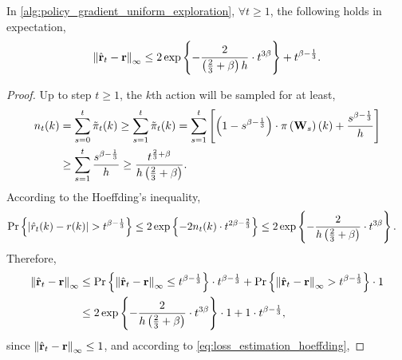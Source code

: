 \begin{thm}
\label{thm:reward_estimation_hoeffding}
    In \cref{alg:policy_gradient_uniform_exploration}, $\forall t \ge 1$, the following holds in expectation,
\begin{equation*}
    \left\| \hat{{\mathbf{r}}}_t - {\mathbf{r}} \right\|_\infty \le 2 \exp\left\{ - \frac{2}{ \left(\frac{2}{3} + \beta \right) h } \cdot t^{3\beta} \right\} + t^{\beta - \frac{1}{3}}.
\end{equation*}
\end{thm}
\begin{proof}
    Up to step $t \ge 1$, the $k$th action will be sampled for at least,
\begin{equation*}
\begin{split}
    n_t(k) &= \sum\limits_{s=0}^{t}{ \tilde{\pi}_t(k)} \ge \sum\limits_{s=1}^{t}{ \tilde{\pi}_t(k)} = \sum\limits_{s=1}^{t}{ \left[ \left( 1 - s^{\beta - \frac{1}{3}} \right) \cdot \pi\left({\mathbf{W}}_{s}\right)(k) + \frac{s^{\beta - \frac{1}{3}}}{h} \right] } \\
    &\ge \sum\limits_{s=1}^{t}{ \frac{s^{\beta - \frac{1}{3}}}{h} } \ge \frac{t^{\frac{2}{3} + \beta}}{ h  \left(\frac{2}{3} + \beta \right) }.
\end{split}
\end{equation*}
According to the Hoeffding's inequality,
\begin{equation}
\label{eq:loss_estimation_hoeffding}
\begin{split}
    {\text{Pr}}\left\{ \left| \hat{r}_{t}(k) - r(k) \right| > t^{\beta - \frac{1}{3}} \right\} &\le 2 \exp\left\{ - 2 n_{t}(k) \cdot t^{2\beta - \frac{2}{3}} \right\} \le 2 \exp\left\{ - \frac{2}{ h  \left(\frac{2}{3} + \beta \right) } \cdot t^{3\beta} \right\}.
\end{split}
\end{equation}
Therefore,
\begin{equation*}
\begin{split}
    \left\| \hat{{\mathbf{r}}}_t - {\mathbf{r}} \right\|_\infty &\le {\text{Pr}}\left\{ \left\| \hat{{\mathbf{r}}}_t - {\mathbf{r}} \right\|_\infty \le t^{\beta - \frac{1}{3}} \right\} \cdot t^{\beta - \frac{1}{3}} + {\text{Pr}}\left\{ \left\| \hat{{\mathbf{r}}}_t - {\mathbf{r}} \right\|_\infty > t^{\beta - \frac{1}{3}} \right\} \cdot 1 \\
    &\le 2 \exp\left\{ - \frac{2}{ h  \left(\frac{2}{3} + \beta \right) } \cdot t^{3\beta} \right\} \cdot 1 + 1 \cdot t^{\beta - \frac{1}{3}},
\end{split}
\end{equation*}
since $\left\| \hat{{\mathbf{r}}}_t - {\mathbf{r}} \right\|_\infty \le 1$, and according to \cref{eq:loss_estimation_hoeffding}, 
\end{proof}

